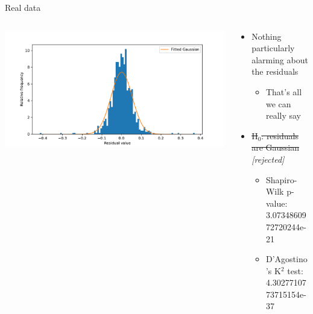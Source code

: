 \documentclass[presentation]{beamer}
\begin{document}
\begin{frame}[label={sec:org0732950}]{Real data}
\begin{columns}
\begin{column}{0.5\columnwidth}
\begin{center}
\includegraphics[width=\textwidth]{./hist.pdf}
\end{center}
\end{column}

\begin{column}{0.5\columnwidth}
\begin{itemize}
\item Nothing particularly alarming about the residuals
\begin{itemize}
\item That's all we can really say
\end{itemize}
\item \sout{H\(_{\text{0}}\): residuals are Gaussian} \emph{\alert{[rejected]}}
\begin{itemize}
\item Shapiro-Wilk p-value: 3.0734860972720244e-21
\item D'Agostino's K\(^{\text{2}}\) test: 4.3027710773715154e-37
\end{itemize}
\end{itemize}
\end{column}
\end{columns}
\end{frame}
\end{document}
